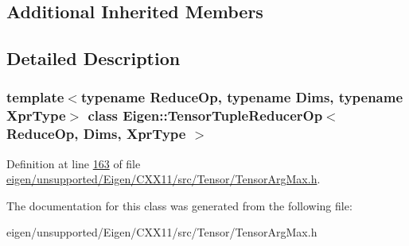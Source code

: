 \subsection*{Additional Inherited Members}


\subsection{Detailed Description}
\subsubsection*{template$<$typename Reduce\+Op, typename Dims, typename Xpr\+Type$>$\newline
class Eigen\+::\+Tensor\+Tuple\+Reducer\+Op$<$ Reduce\+Op, Dims, Xpr\+Type $>$}



Definition at line \hyperlink{eigen_2unsupported_2_eigen_2_c_x_x11_2src_2_tensor_2_tensor_arg_max_8h_source_l00163}{163} of file \hyperlink{eigen_2unsupported_2_eigen_2_c_x_x11_2src_2_tensor_2_tensor_arg_max_8h_source}{eigen/unsupported/\+Eigen/\+C\+X\+X11/src/\+Tensor/\+Tensor\+Arg\+Max.\+h}.



The documentation for this class was generated from the following file\+:\begin{DoxyCompactItemize}
\item 
eigen/unsupported/\+Eigen/\+C\+X\+X11/src/\+Tensor/\+Tensor\+Arg\+Max.\+h\end{DoxyCompactItemize}
